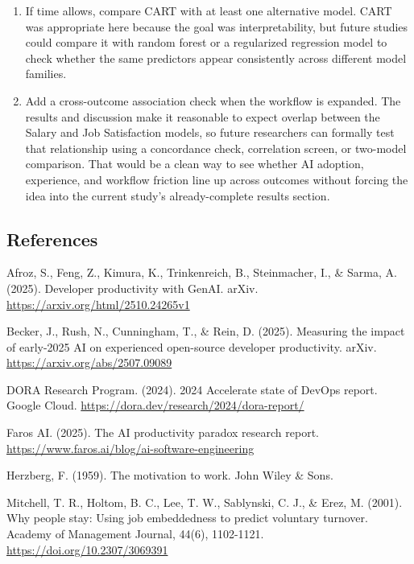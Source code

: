 \documentclass[
]{article}
\begin{document}
\begin{enumerate}
  imputation and tree fitting are both stochastic, future work should
  report the seed used for the main run, the full seed-sensitivity
  table, and the selected hyperparameters. A small appendix of alternate
  runs is often enough to show that the result is not a one-seed
  artifact.
\item
  If time allows, compare CART with at least one alternative model. CART
  was appropriate here because the goal was interpretability, but future
  studies could compare it with random forest or a regularized
  regression model to check whether the same predictors appear
  consistently across different model families.
\item
  Add a cross-outcome association check when the workflow is expanded.
  The results and discussion make it reasonable to expect overlap
  between the Salary and Job Satisfaction models, so future researchers
  can formally test that relationship using a concordance check,
  correlation screen, or two-model comparison. That would be a clean way
  to see whether AI adoption, experience, and workflow friction line up
  across outcomes without forcing the idea into the current study's
  already-complete results section.
\end{enumerate}

\subsection{References}\label{references}

Afroz, S., Feng, Z., Kimura, K., Trinkenreich, B., Steinmacher, I., \&
Sarma, A. (2025). Developer productivity with GenAI. arXiv.
\url{https://arxiv.org/html/2510.24265v1}

Becker, J., Rush, N., Cunningham, T., \& Rein, D. (2025). Measuring the
impact of early-2025 AI on experienced open-source developer
productivity. arXiv. \url{https://arxiv.org/abs/2507.09089}

DORA Research Program. (2024). 2024 Accelerate state of DevOps report.
Google Cloud. \url{https://dora.dev/research/2024/dora-report/}

Faros AI. (2025). The AI productivity paradox research report.
\url{https://www.faros.ai/blog/ai-software-engineering}

Herzberg, F. (1959). The motivation to work. John Wiley \& Sons.

Mitchell, T. R., Holtom, B. C., Lee, T. W., Sablynski, C. J., \& Erez,
M. (2001). Why people stay: Using job embeddedness to predict voluntary
turnover. Academy of Management Journal, 44(6), 1102-1121.
\url{https://doi.org/10.2307/3069391}
\end{document}
